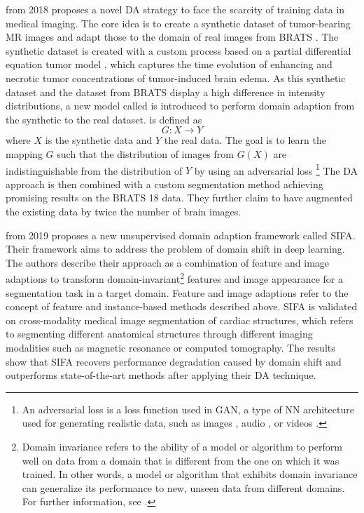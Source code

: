  \cite{DBLP:journals/corr/abs-1810-05732} from 2018 proposes a novel \ac{DA} strategy to face the scarcity of training data in medical imaging. The core idea is to create a synthetic dataset of tumor-bearing \ac{MR} images and adapt those to the domain of real images from BRATS \cite{Menze2014-gj}. The synthetic dataset is created with a custom process based on a partial differential equation tumor model \cite{subramanian2019simulation}, which captures the time evolution of enhancing and necrotic tumor concentrations of tumor-induced brain edema. As this synthetic dataset and the dataset from BRATS display a high difference in intensity distributions, a new model called  is introduced to perform domain adaption from the synthetic to the real dataset.  is defined as
\begin{equation}
    G:X \to Y
\end{equation}
where $X$ is the synthetic data and $Y$ the real data. The goal is to learn the mapping $G$ such that the distribution of images from $G(X)$ are indistinguishable from the distribution of $Y$ by using an adversarial loss \footnote{An adversarial loss is a loss function used in \acf{GAN}\cite{https://doi.org/10.48550/arxiv.1511.05644}, a type of \ac{NN} architecture used for generating realistic data, such as images \cite{yi2019generative}, audio \cite{donahue2018adversarial}, or videos \cite{yu2022generating}.} The \ac{DA} approach is then combined with a custom segmentation method achieving promising results on the BRATS 18 data. They further claim to have augmented the existing data by twice the number of brain images.

 \cite{Chen_Dou_Chen_Qin_Heng_2019} from 2019 proposes a new unsupervised domain adaption framework called \ac{SIFA}. Their framework aims to address the problem of domain shift in deep learning. The authors describe their approach as a combination of feature and image adaptions to transform domain-invariant\footnote{Domain invariance refers to the ability of a model or algorithm to perform well on data from a domain that is different from the one on which it was trained. In other words, a model or algorithm that exhibits domain invariance can generalize its performance to new, unseen data from different domains. For further information, see \cite{tzeng2014deep}.} features and image appearance for a segmentation task in a target domain. Feature and image adaptions refer to the concept of feature and instance-based methods described above. \ac{SIFA} is validated on cross-modality medical image segmentation of cardiac structures, which refers to segmenting different anatomical structures through different imaging modalities such as magnetic resonance or computed tomography. The results show that \ac{SIFA} recovers performance degradation caused by domain shift and outperforms state-of-the-art methods after applying their \ac{DA} technique.

